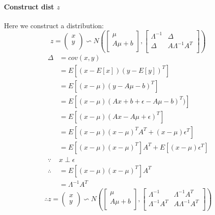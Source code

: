 \documentclass{report}
\begin{document}
\paragraph{Construct dist $z$\\}
Here we construct a distribution:
$$
z = 
\left (
\begin{matrix}
x\\
y\\
\end{matrix}
\right )
\backsim N(
\left [
\begin{matrix}
\mu\\
A\mu+b\\
\end{matrix}
\right ],
\left [
\begin{matrix}
\Lambda^{-1}&\Delta\\
\Delta&A\Lambda^{-1} A^T\\
\end{matrix}
\right ]
)
$$
$$
\begin{aligned}
\Delta
&=cov(x,y)\\
&=E[(x-E[x])(y-E[y])^T]\\
&=E[(x-\mu)(y-A\mu - b)^T]\\
&=E[(x-\mu)(Ax+b+ \epsilon -A\mu -b)^T)]\\
&=E[(x-\mu)(Ax-A\mu + \epsilon)^T]\\
&=E[(x-\mu)(x-\mu)^T A^T + (x-\mu)\epsilon^T]\\
&=E[(x-\mu)(x-\mu)^T]A^T + E[(x-\mu)\epsilon^T] \\
\because &x \perp \epsilon\\
\therefore &=E[(x-\mu)(x-\mu)^T]A^T\\
&=\Lambda^{-1}A^T
\end{aligned}
$$
$$
\therefore z=
\left ( \begin{matrix}
x\\y
\end{matrix} \right )
\backsim N(
\left [
\begin{matrix}
\mu\\
A\mu+b\\
\end{matrix}
\right ],
\left [
\begin{matrix}
\Lambda^{-1}&\Lambda^{-1}A^T\\
\Lambda^{-1}A^T&A\Lambda^{-1} A^T\\
\end{matrix}
\right ]
)
$$
\end{document}
